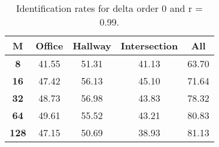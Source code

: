 \begin{table}[h]
    \small
    \centering
    \begin{tabular}{|c|c|c|c|l|}    
    \hline
    {\bf M} & {\bf Office} & {\bf Hallway} & {\bf Intersection} &     \multicolumn{1}{c|}{{\bf All}} \\ \hline
    {\bf 8} & 41.55 & 51.31 & 41.13 & 63.70 \\ \hline
    {\bf 16} & 47.42 & 56.13 & 45.10 & 71.64 \\ \hline
    {\bf 32} & 48.73 & 56.98 & 43.83 & 78.32 \\ \hline
    {\bf 64} & 49.61 & 55.52 & 43.21 & 80.83 \\ \hline
    {\bf 128} & 47.15 & 50.69 & 38.93 & 81.13 \\ \hline
    \end{tabular}
    \caption{Identification rates for delta order 0 and r = 0.99.}    
    \label{tab:identify_speakers_0.99_mit_19_0}
\end{table}
